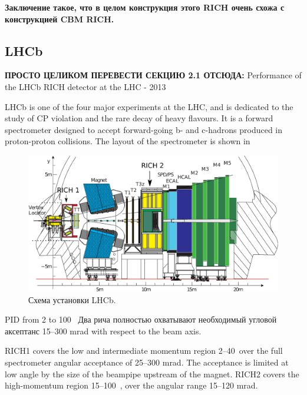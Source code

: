 \textbf{Заключение такое, что в целом конструкция этого RICH очень схожа с конструкцией CBM RICH.}


\subsection{LHCb}\label{sec:LHCb}


\todo \textbf{ПРОСТО ЦЕЛИКОМ ПЕРЕВЕСТИ СЕКЦИЮ 2.1 ОТСЮДА:}
Performance of the LHCb RICH detector at the LHC - 2013




LHCb is one of the four major experiments at the LHC, and is dedicated to the study of CP violation and the rare decay of heavy flavours. It is a forward spectrometer designed to accept forward-going b- and c-hadrons produced in proton-proton collisions. The layout of the spectrometer is shown in 

\begin{figure}[H]
\centering
\includegraphics[width=1.0\textwidth]{pictures/LHCb.png}
\caption{Схема установки LHCb.}
\label{fig:LHCb}
\end{figure}

PID from 2 to 100~\GeVoverC
Два рича полностью охватывают необходимый угловой аксептанс 15–300 mrad with respect to the beam axis.


RICH1 covers the low and intermediate momentum region 2–40~\GeVoverC over the full spectrometer angular acceptance of 25–300 mrad. The acceptance is limited at low angle by the size of the beampipe upstream of the magnet. RICH2 covers the high-momentum region 15–100~\GeVoverC, over the angular range 15–120 mrad.

